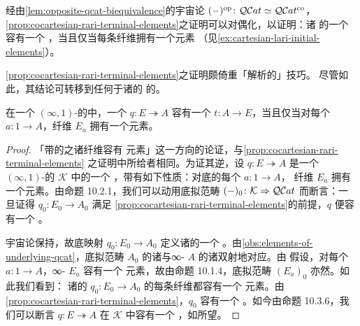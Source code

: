 经由\cref{lem:opposite-qcat-biequivalence}的宇宙论\trBiequivalence{}
$(-)^{\mathrm{op}}\colon\mathcal{Q}\mathcal{C}at\simeq\mathcal{Q}\mathcal{C}at^{\mathrm{co}}$，
\cref{prop:cocartesian-rari-terminal-elements}之证明可以对偶化，以证明：诸%
\trQuasiCategory{}的一个\trCartesianFibration{}容有一个%
\trLeftAdjoint\trRightInverse，当且仅当每条纤维拥有一个\trInitial{}元素
（见\cref{ex:cartesian-lari-initial-elements}）。

\cref{prop:cocartesian-rari-terminal-elements}之证明颇倚重「解析的」技巧。
尽管如此，其结论可转移到任何\trBiequivalence{}于诸\trQuasiCategory{}的%
\trInfinityCosmos{}的\trInfinityCosmos。

\begin{proposition}\label{prop:pointwise-terminal-cocartesian-rari}
在一个 $(\infty,1)$-\trCategory{}的\trInfinityCosmos{}中，一个%
\trCocartesianFibration{} $q\colon E\twoheadrightarrow A$ 容有一个%
\trRightAdjoint\trRightInverse{} $t\colon A\to E$，当且仅当对每个\trElement{}
$a\colon 1\to A$，纤维 $E_{a}$ 拥有一个\trTerminal{}元素。
\end{proposition}

\begin{proof}
「带\trRightAdjoint\trRightInverse{}的\trIsofibration{}之诸纤维容有%
\trTerminal{}元素」这一方向的论证，与\cref{prop:cocartesian-rari-terminal-elements}
之证明中所给者相同。为证其逆，设 $q\colon E\twoheadrightarrow A$ 是一个
$(\infty,1)$-\trCategory{}的\trInfinityCosmos{} $\mathcal{K}$ 中的一个%
\trCocartesianFibration，带有如下性质：对底的每个\trElement{} $a\colon 1\to A$，
纤维 $E_{a}$ 拥有一个\trTerminal{}元素。由命题 10.2.1，我们可以动用底拟范畴%
\trBiequivalence{} $(-)_{0}\colon\mathcal{K}\Rightarrow\mathcal{Q}\mathcal{C}at$ 而断言：一旦证得
$q_{0}\colon E_{0}\to A_{0}$ 满足%
\cref{prop:cocartesian-rari-terminal-elements}的前提，$q$ 便容有一个%
\trRightAdjoint\trRightInverse。

宇宙论\trFunctor{}保持\trCocartesianFibration，故底映射
$q_{0}\colon E_{0}\to A_{0}$ 定义诸\trQuasiCategory{}的一个%
\trCocartesianFibration。由\cref{obs:elements-of-underlying-qcat}，底拟范畴
$A_{0}$ 的诸\trElement{}与∞-\trCategory{} $A$ 的诸\trElement{}双射地对应。由
假设，对每个\trElement{} $a\colon 1\to A$，∞-\trCategory{} $E_{a}$ 容有一个%
\trTerminal{}元素，故由命题 10.1.4，底拟范畴 $(E_{a})_{0}$ 亦然。如此我们看到：
诸\trQuasiCategory{}的\trCocartesianFibration{}
$q_{0}\colon E_{0}\to A_{0}$ 的每条纤维都容有一个\trTerminal{}%
元素。由\cref{prop:cocartesian-rari-terminal-elements}，$q_{0}$ 容有一个%
\trRightAdjoint\trRightInverse。如今由命题 10.3.6，我们可以断言
$q\colon E\twoheadrightarrow A$ 在 $\mathcal{K}$ 中容有一个%
\trRightAdjoint\trRightInverse，如所望。
\end{proof}

